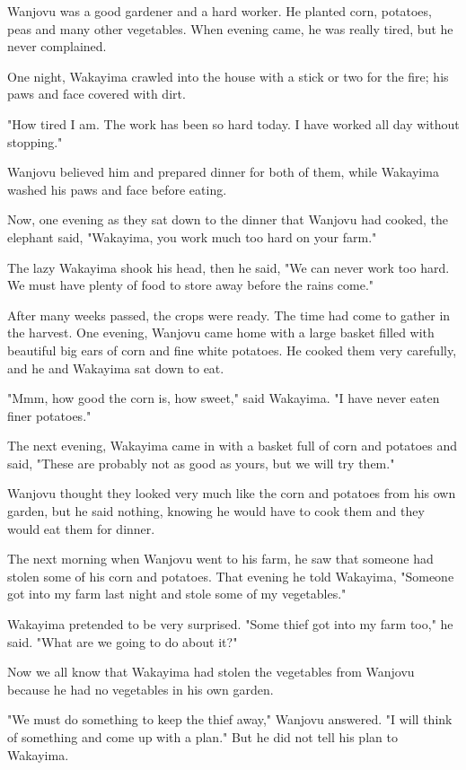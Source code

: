 Wanjovu was a good gardener and a hard worker. He planted corn, potatoes, peas and many other vegetables. When evening came, he was really tired, but he never complained.

One night, Wakayima crawled into the house with a stick or two for the fire; his paws and face covered with dirt.

"How tired I am. The work has been so hard today. I have worked all day without stopping."

Wanjovu believed him and prepared dinner for both of them, while Wakayima washed his paws and face before eating.

Now, one evening as they sat down to the dinner that Wanjovu had cooked, the elephant said, "Wakayima, you work much too hard on your farm."

The lazy Wakayima shook his head, then he said, "We can never work too hard. We must have plenty of food to store away before the rains come."

After many weeks passed, the crops were ready. The time had come to gather in the harvest. One evening, Wanjovu came home with a large basket filled with beautiful big ears of corn and fine white potatoes. He cooked them very carefully, and he and Wakayima sat down to eat.

"Mmm, how good the corn is, how sweet," said Wakayima. "I have never eaten finer potatoes."

The next evening, Wakayima came in with a basket full of corn and potatoes and said, "These are probably not as good as yours, but we will try them."

Wanjovu thought they looked very much like the corn and potatoes from his own garden, but he said nothing, knowing he would have to cook them and they would eat them for dinner.

The next morning when Wanjovu went to his farm, he saw that someone had stolen some of his corn and potatoes. That evening he told Wakayima, "Someone got into my farm last night and stole some of my vegetables."

Wakayima pretended to be very surprised. "Some thief got into my farm too," he said. "What are we going to do about it?"

Now we all know that Wakayima had stolen the vegetables from Wanjovu because he had no vegetables in his own garden.

"We must do something to keep the thief away," Wanjovu answered. "I will think of something and come up with a plan." But he did not tell his plan to Wakayima.


